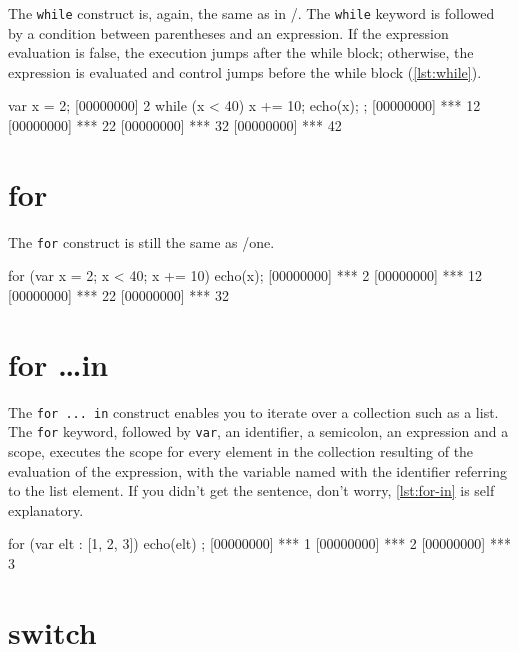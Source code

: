 The \texttt{while} construct is, again, the same as in \C/\Cxx. The
\texttt{while} keyword is followed by a condition between parentheses
and an expression. If the expression evaluation is false, the
execution jumps after the while block; otherwise, the expression is
evaluated and control jumps before the while block (\autoref{lst:while}).

\begin{urbiscript}[caption=The \texttt{while} construct,
label=lst:while]
var x = 2;
[00000000] 2
while (x < 40)
{
  x += 10;
  echo(x);
};
[00000000] *** 12
[00000000] *** 22
[00000000] *** 32
[00000000] *** 42
\end{urbiscript}

\section{for}

The \texttt{for} construct is still the same as \C/\Cxx one.

\begin{urbiscript}[caption=Nihil novi sub sole, label=lst:for]
for (var x = 2; x < 40; x += 10)
  echo(x);
[00000000] *** 2
[00000000] *** 12
[00000000] *** 22
[00000000] *** 32
\end{urbiscript}

\section{for \ldots in}

The \texttt{for ... in} construct enables you to iterate over a
collection such as a list. The \texttt{for} keyword, followed by
\lstinline|var|, an identifier, a semicolon, an expression and a
scope, executes the scope for every element in the collection
resulting of the evaluation of the expression, with the variable named
with the identifier referring to the list element. If you didn't get
the sentence, don't worry, \autoref{lst:for-in} is self explanatory.

\begin{urbiscript}[caption=Collection iteration with \texttt{for},
label=lst:for-in]
for (var elt : [1, 2, 3]) { echo(elt) };
[00000000] *** 1
[00000000] *** 2
[00000000] *** 3
\end{urbiscript}

\section{switch}

